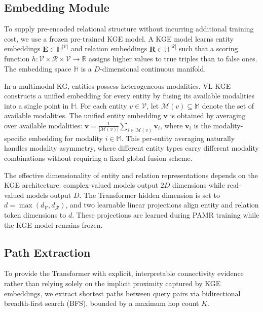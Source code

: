 \documentclass[runningheads]{llncs}
\begin{document}
\subsection{Embedding Module}
\label{sec:embedding-module}

To supply pre-encoded relational structure without incurring additional
training cost, we use a frozen pre-trained KGE model.  A KGE model
learns entity embeddings $\mathbf{E} \in \mathbb{H}^{|\mathcal{V}|}$
and relation embeddings $\mathbf{R} \in \mathbb{H}^{|\mathcal{R}|}$
such that a scoring function $h: \mathcal{V} \times \mathcal{R} \times
\mathcal{V} \to \mathbb{R}$ assigns higher values to true triples
than to false ones.  The embedding space $\mathbb{H}$ is a
$D$-dimensional continuous manifold.

In a multimodal KG, entities possess heterogeneous modalities.
VL-KGE~\cite{efthymiou2026vlkge} constructs a unified embedding for
every entity by fusing its available modalities into a single point
in $\mathbb{H}$.  For each entity $v \in \mathcal{V}$, let
$\mathcal{M}(v) \subseteq \mathbb{M}$ denote the set of available
modalities.  The unified entity embedding $\mathbf{v}$ is obtained
by averaging over available modalities:
$\mathbf{v} = \frac{1}{|\mathcal{M}(v)|} \sum_{i \in \mathcal{M}(v)} \mathbf{v}_i$,
where $\mathbf{v}_i$ is the modality-specific embedding for modality
$i \in \mathbb{M}$.  This per-entity averaging naturally handles
modality asymmetry, where different entity types carry different
modality combinations without requiring a fixed global fusion scheme.

The effective dimensionality of entity and relation representations
depends on the KGE architecture: complex-valued models output $2D$
dimensions while real-valued models output $D$. The Transformer
hidden dimension is set to $d = \max(d_{\mathcal{V}},
d_{\mathcal{R}})$, and two learnable linear projections align entity
and relation token dimensions to $d$. These
projections are learned during PAMR training while the KGE model
remains frozen.

\subsection{Path Extraction}
\label{sec:path-extraction}

To provide the Transformer with explicit, interpretable connectivity evidence rather than
relying solely on the implicit proximity captured by KGE embeddings, we extract shortest
paths between query pairs via bidirectional breadth-first search (BFS), bounded by a
maximum hop count $K$.
\end{document}
